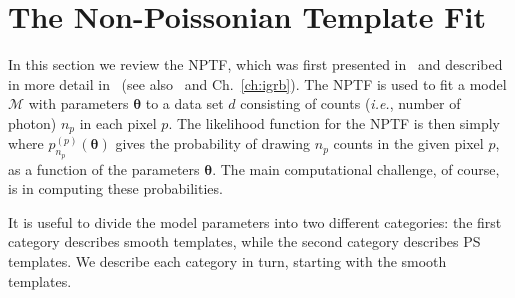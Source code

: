 \section{The Non-Poissonian Template Fit}
\label{NPTF}

In this section we review the NPTF, which was first presented in~\cite{Lee:2015fea} and described in more detail in~\cite{Linden:2016rcf,Lisanti:2016jub} (see also~\cite{Malyshev:2011zi,Lee:2014mza,Zechlin:2015wdz,Zechlin:2016pme} and Ch.~\ref{ch:igrb}).  The NPTF is used to fit a model $\mathcal{M}$ with parameters $\bm{\theta}$ to a data set $d$ consisting of counts (\emph{i.e.}, number of photon) $n_p$ in each pixel $p$.  The likelihood function for the NPTF is then simply
where $p_{n_p}^{(p)}( {\bm \theta})$ gives the probability of drawing $n_p$ counts in the given pixel $p$, as a function of the parameters $\bm{\theta}$.  The main computational challenge, of course, is in computing these probabilities.

It is useful to divide the model parameters into two different categories: the first category describes smooth templates, while the second category describes PS templates.  We describe each category in turn, starting with the smooth templates.  

